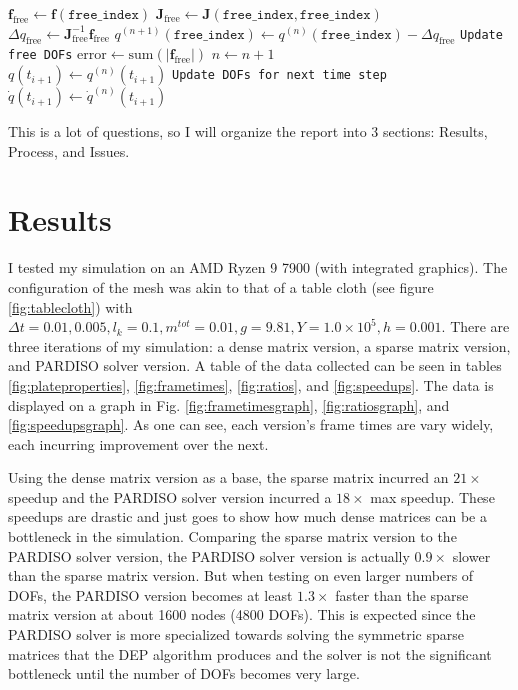 \documentclass[letterpaper, 10 pt, conference]{ieeeconf}  %
\begin{document}
\begin{algorithm}[h]
\begin{algorithmic}[1]
                        \State $\mathbf{f}_\text{free} \gets \mathbf{f}(\texttt{free\_index})$
                        \State $\mathbf{J}_\text{free} \gets \mathbf{J}(\texttt{free\_index}, \texttt{free\_index})$\\
                        \State $\Delta q_\text{free} \gets \mathbf{J}_\text{free}^{-1} \mathbf{f}_\text{free}$
                        \State $q^{(n+1)}(\texttt{free\_index}) \gets q^{(n)}(\texttt{free\_index}) - \Delta q_\text{free}$ \hfill \texttt{Update free DOFs}
                        \State $\text{error} \gets \text{sum}(\lvert \mathbf{f}_\text{free} \rvert)$
                        \State $n \gets n + 1$ \\
                    \EndWhile
                    \State $q(t_{i+1}) \gets q^{(n)}(t_{i+1})$                  \hfill \texttt{Update DOFs for next time step}
                    \State $\dot{q}(t_{i+1}) \gets \dot{q}^{(n)}(t_{i+1})$
                \EndFunction
                \end{algorithmic}
                \end{algorithm}
\twocolumn


This is a lot of questions, so I will organize the report into 3 sections: Results, Process, and Issues. 

\section{Results}
I tested my simulation on an AMD Ryzen 9 7900 (with integrated graphics). The configuration of the mesh was akin to that of a table cloth (see figure \ref{fig:tablecloth}) with $\Delta t = 0.01, 0.005, l_k = 0.1, m^{tot} = 0.01, g = 9.81, Y=1.0\times 10^5, h = 0.001$. There are three iterations of my simulation: a dense matrix version, a sparse matrix version, and PARDISO solver version. A table of the data collected can be seen in tables \ref{fig:plateproperties}, \ref{fig:frametimes}, \ref{fig:ratios}, and \ref{fig:speedups}. The data is displayed on a graph in Fig. \ref{fig:frametimesgraph}, \ref{fig:ratiosgraph}, and \ref{fig:speedupsgraph}. As one can see, each version's frame times are vary widely, each incurring improvement over the next. 

Using the dense matrix version as a base, the sparse matrix incurred an $21\times$ speedup and the PARDISO solver version incurred a $18\times$ max speedup. These speedups are drastic and just goes to show how much dense matrices can be a bottleneck in the simulation. Comparing the sparse matrix version to the PARDISO solver version, the PARDISO solver version is actually $0.9\times$ slower than the sparse matrix version. But when testing on even larger numbers of DOFs, the PARDISO version becomes at least $1.3\times$ faster than the sparse matrix version at about 1600 nodes (4800 DOFs). This is expected since the PARDISO solver is more specialized towards solving the symmetric sparse matrices that the DEP algorithm produces and the solver is not the significant bottleneck until the number of DOFs becomes very large.
\end{document}

